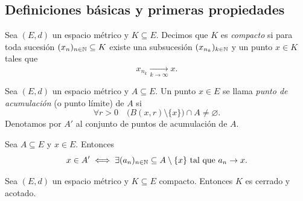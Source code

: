 \subsection{Definiciones básicas y primeras propiedades}

\begin{defi}
Sea $(E,d)$ un espacio métrico y $K \subseteq E$. Decimos que $K$ es
\emph{compacto} si para toda sucesión $(x_n)_{n\in\mathbb{N}} \subseteq K$ existe
una subsucesión $(x_{n_k})_{k\in\mathbb{N}}$ y un punto $x \in K$ tales que
\[
x_{n_k} \xrightarrow[k\to\infty]{} x.
\]
\end{defi}

\begin{defi}
Sea $(E,d)$ un espacio métrico y $A \subseteq E$.
Un punto $x \in E$ se llama \emph{punto de acumulación} (o punto límite)
de $A$ si
\[
\forall r>0 \quad \bigl(B(x,r)\setminus\{x\}\bigr) \cap A \neq \varnothing.
\]
Denotamos por $A'$ al conjunto de puntos de acumulación de $A$.
\end{defi}

\begin{prop}
Sea $A \subseteq E$ y $x \in E$. Entonces
\[
x \in A' \iff \exists (a_n)_{n\in\mathbb{N}} \subseteq A\setminus\{x\}
\text{ tal que } a_n \to x.
\]
\end{prop}

\begin{prop}
Sea $(E,d)$ un espacio métrico y $K \subseteq E$ compacto. Entonces $K$ es
cerrado y acotado.
\end{prop}

